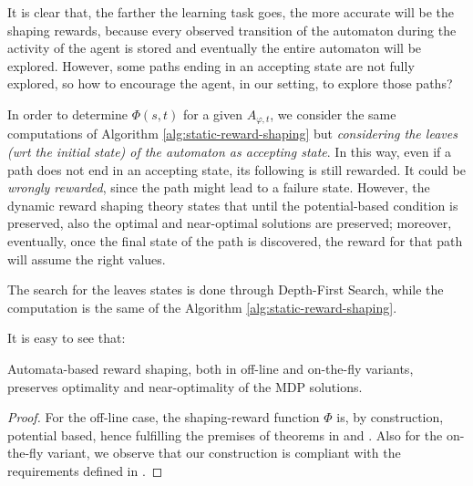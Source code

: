 It is clear that, the farther the learning task goes, the more accurate will be the shaping rewards, because every observed transition of the automaton during the activity of the agent is stored and eventually the entire automaton will be explored. However, some paths ending in an accepting state are not fully explored, so how to encourage the agent, in our setting, to explore those paths?

In order to determine $\Phi(s, t)$ for a given $A_{\varphi, t}$, we consider the same computations of Algorithm \ref{alg:static-reward-shaping} but \emph{considering the leaves (wrt the initial state) of the automaton as accepting state}. In this way, even if a path does not end in an accepting state, its following is still rewarded. It could be \emph{wrongly rewarded}, since the path might lead to a failure state. However, the dynamic reward shaping theory states that until the potential-based condition is preserved, also the optimal and near-optimal solutions are preserved; moreover, eventually, once the final state of the path is discovered, the reward for that path will assume the right values.

The search for the leaves states is done through Depth-First Search, while the computation is the same of the Algorithm \ref{alg:static-reward-shaping}.

\medskip
It is easy to see that:

\begin{theorem}
	Automata-based reward shaping, both in off-line and on-the-fly variants, preserves optimality and near-optimality of the MDP solutions.
\end{theorem}
\begin{proof} For the off-line case, the shaping-reward function $\Phi$ is, by construction, potential based, hence fulfilling the premises of theorems in \citep{Ng:1999:PIU:645528.657613} and \citep{Grzes:2017:RSE:3091125.3091208}.
	Also for the on-the-fly variant, we observe that our construction is compliant with the requirements defined in \citep{Devlin:2012:DPR:2343576.2343638}.
\end{proof}